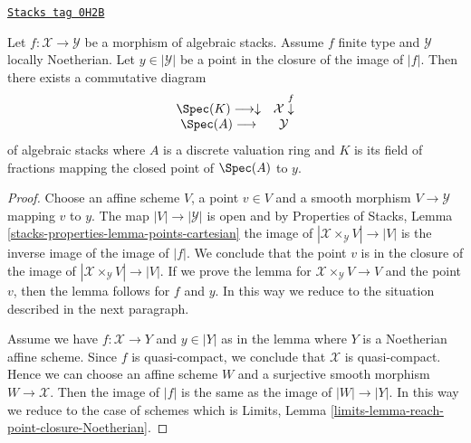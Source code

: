 \begin{lemma}
\label{stacks-more-morphisms-lemma-reach-point-closure-Noetherian}
\href{https://stacks.math.columbia.edu/tag/0H2B}{\texttt{Stacks tag 0H2B}}

Let $f : \mathcal{X} \to \mathcal{Y}$ be a morphism of algebraic stacks.
Assume $f$ finite type and $\mathcal{Y}$ locally Noetherian.
Let $y \in |\mathcal{Y}|$ be a point in the closure of the image of $|f|$.
Then there exists a commutative diagram
$$
\begin{array}{cc}\Spec(K) \longrightarrow\downarrow & \mathcal{X} \overset{f}{\downarrow} \\ \Spec(A) \longrightarrow & \mathcal{Y}\end{array}
$$
of algebraic stacks where $A$ is a discrete valuation ring and $K$
is its field of fractions mapping the closed point of $\Spec(A)$ to $y$.
\end{lemma}

\begin{proof}
Choose an affine scheme $V$, a point $v \in V$ and a smooth morphism
$V \to \mathcal{Y}$ mapping $v$ to $y$. The map $|V| \to |\mathcal{Y}|$
is open and by
Properties of Stacks, Lemma \ref{stacks-properties-lemma-points-cartesian}
the image of $|\mathcal{X} \times_\mathcal{Y} V| \to |V|$
is the inverse image of the image of $|f|$.
We conclude that the point $v$ is in the closure of the
image of $|\mathcal{X} \times_\mathcal{Y} V| \to |V|$.
If we prove the lemma for
$\mathcal{X} \times_\mathcal{Y} V \to V$ and the point $v$, then
the lemma follows for $f$ and $y$.
In this way we reduce to the situation described in the
next paragraph.

\medskip\noindent
Assume we have $f : \mathcal{X} \to Y$ and $y \in |Y|$ as in the lemma where
$Y$ is a Noetherian affine scheme. Since $f$ is quasi-compact, we conclude that
$\mathcal{X}$ is quasi-compact. Hence we can choose an affine scheme $W$ and
a surjective smooth morphism $W \to \mathcal{X}$. Then the image of
$|f|$ is the same as the image of $|W| \to |Y|$. In this way we reduce
to the case of schemes which is
Limits, Lemma \ref{limits-lemma-reach-point-closure-Noetherian}.
\end{proof}

